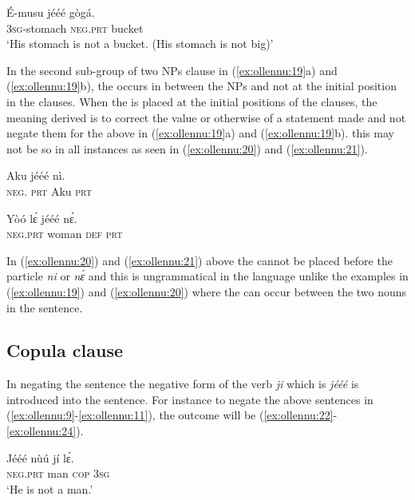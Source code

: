 \documentclass[output=paper
,newtxmath
,modfonts
,nonflat]{langsci/langscibook}
\begin{document}
\ea \label{ex:ollennu:51}
\gll \'E-musu j\'e\'e\'e g\`og\'a.\\
3\textsc{sg}-stomach \textsc{neg}.\textsc{prt} bucket\\
\glt 	`His stomach is not a bucket. (His stomach is not big)'
\z


In the second sub-group of two NPs clause in (\ref{ex:ollennu:19}a) and (\ref{ex:ollennu:19}b), the  occurs in between the NPs and not at the initial position in the clauses. When the  is placed at the initial positions of the clauses, the meaning derived is to correct the value or otherwise of a statement made and not negate them for the above in (\ref{ex:ollennu:19}a) and (\ref{ex:ollennu:19}b). this may not be so in all instances as seen in (\ref{ex:ollennu:20}) and (\ref{ex:ollennu:21}).

\ea \label{ex:ollennu:20}
\gll * Aku j\'e\'e\'e n\`i. \\
{} \textsc{neg}. \textsc{prt} Aku \textsc{prt}\\
\z

\ea \label{ex:ollennu:21}
\gll * Y\`o\'o l\'ɛ j\'e\'e\'e n\'ɛ.\\
{} \textsc{neg}.\textsc{prt} woman \textsc{def} \textsc{prt}\\
\z


In (\ref{ex:ollennu:20}) and (\ref{ex:ollennu:21}) above the  cannot be placed before the particle \textit{ni} or \textit{n\'ɛ} and this is ungrammatical in the language unlike the examples in (\ref{ex:ollennu:19}) and (\ref{ex:ollennu:20}) where the  can occur between the two nouns in the sentence.

\subsection{\label{sec:ollennu:2.2} Copula clause}

In negating the  sentence the negative form of the  verb \textit{ji} which is \textit{j\'e\'e\'e} is introduced into the sentence. For instance to negate the above  sentences in (\ref{ex:ollennu:9}-\ref{ex:ollennu:11}), the outcome will be (\ref{ex:ollennu:22}-\ref{ex:ollennu:24}).

\ea \label{ex:ollennu:22}
\gll J\'e\'e\'e n\`u\'u j\'i l\'ɛ.\\
\textsc{neg}.\textsc{prt} man \textsc{cop} 3\textsc{sg}\\
\glt `He is not a man.'
\z
\end{document}
